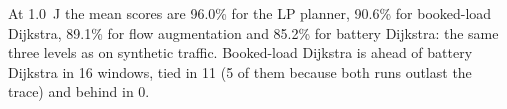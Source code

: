 At 1.0~J the mean scores are 96.0\% for the LP planner, 90.6\% for booked-load Dijkstra, 89.1\% for flow augmentation and 85.2\% for battery Dijkstra: the same three levels as on synthetic traffic. Booked-load Dijkstra is ahead of battery Dijkstra in 16 windows, tied in 11 (5 of them because both runs outlast the trace) and behind in 0.
